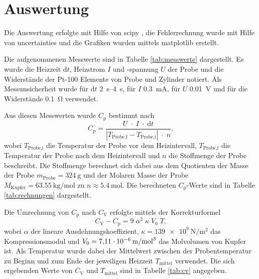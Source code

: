 \newpage
\section{Auswertung}
\label{sec:Auswertung}

Die Auswertung erfolgte mit Hilfe von scipy \cite{scipy},
die Fehlerrechnung wurde mit Hilfe von uncertainties \cite{uncertainties}
und die Grafiken wurden mittels matplotlib \cite{matplotlib} erstellt.

Die aufgenommenen Messwerte sind in Tabelle \ref{tab:messwerte}
dargestellt. Es wurde die Heizzeit $\text{d}t$, Heizstrom $I$ und -spannung $U$ der Probe und
die Widerstände der Pt-100 Elemente von Probe und Zylinder notiert. Als Messunsicherheit
wurde für $\text{d}t$ \SIrange{2}{4}{\second},
für $I$ \SI{0.3}{\milli\ampere},
für $U$ \SI{0.01}{\volt} und
für die Widerstände \SI{0.1}{\ohm} verwendet.


Aus diesen Messwerten wurde $C_\text{p}$ bestimmt nach
\begin{equation}
    C_\text{p} = \frac{U\;\cdot\;I\;\cdot\;\text{d}t}{|T_\text{Probe,f}-T_\text{Probe,i}|\;\cdot\;n}
    \text{,}
\end{equation}
wobei $T_\text{Probe,i}$ die Temperatur der Probe vor dem Heizintervall, $T_\text{Probe,f}$
die Temperatur der Probe nach dem Heizintervall und $n$ die Stoffmenge der Probe beschreibt.
Die Stoffmenge berechnet sich dabei aus dem Quotienten der Masse der Probe
$m_\text{Probe} = \SI{324}{\gram}$ \cite{anleitung} und der Molaren Masse der Probe
$M_\text{Kupfer} = \SI{63.55}{\kilo\gram\per\mole}$ \cite{lenntech} zu
$n \approx \SI{5.4}{\mole}$. Die berechneten $C_\text{p}$-Werte sind in Tabelle
\ref{tab:rechnungen} dargestellt.

Die Umrechnung von $C_\text{p}$ nach $C_\text{V}$ erfolgte mittels der Korrekturformel
\begin{equation}
    C_\text{V} - C_\text{p} = 9\;\alpha^2\;\kappa\;V_0\;T\text{,}
\end{equation}
wobei $\alpha$ der lineare Ausdehnungskoeffizient,
$\kappa = \SI{139e9}{\newton\per\meter\squared}$ \cite{demtroeder} das Kompressionsmodul
und $V_0 = \SI{7.11e-6}{\meter\raiseto{3}\per\mole}$ \cite{webelements} das Molvolumen
von Kupfer ist. Als Temperatur wurde dabei der Mittelwert zwischen der Probentemperatur
zu Beginn und zum Ende der jeweiligen Heizzeit $T_\text{mittel}$ verwendet.
Die sich ergebenden Werte von $C_\text{V}$ und $T_\text{mittel}$ sind in Tabelle
\ref{tab:cv} angegeben.

